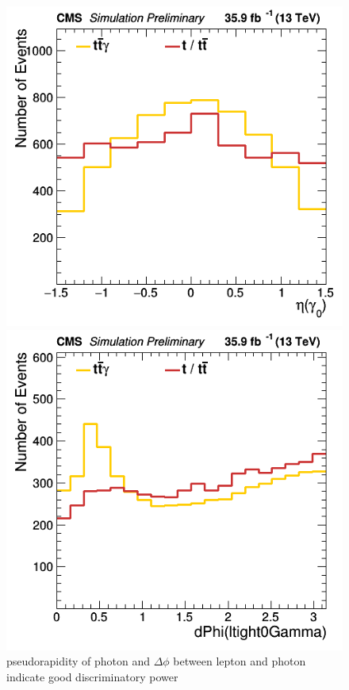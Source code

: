 \documentclass[11pt]{scrartcl}
\begin{document}
	\begin{figure}[H]
	\centering
	\begin{minipage}{.5\textwidth}
	  \centering
	  \includegraphics[width=0.70\linewidth]{figures/Select3/PhotonGood0_eta.png}
	\end{minipage}%
	\begin{minipage}{.5\textwidth}
	  \centering
	  \includegraphics[width=0.70\linewidth]{figures/Select3/ltight0GammadPhi.png}
	\end{minipage}
	\caption{pseudorapidity of photon and $\Delta\phi$ between lepton and photon indicate good discriminatory power}
	\end{figure}
	
\end{document}
